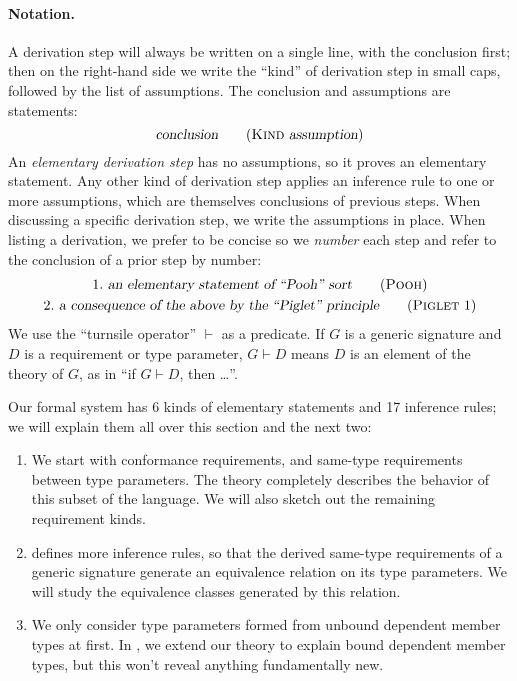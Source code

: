 \documentclass[../generics]{subfiles}
\begin{document}
\paragraph{Notation.} A derivation step will always be written on a single line, with the conclusion first; then on the right-hand side we write the ``kind'' of derivation step in small caps, followed by the list of assumptions. The conclusion and assumptions are statements:
\[\textsl{conclusion}\tag{\textsc{Kind} \textsl{assumption}}\]
An \emph{elementary derivation step} has no assumptions, so it proves an elementary statement. Any other kind of derivation step applies an inference rule to one or more assumptions, which are themselves conclusions of previous steps. When discussing a specific derivation step, we write the assumptions in place. When listing a derivation, we prefer to be concise so we \emph{number} each step and refer to the conclusion of a prior step by number:
\begin{gather*}
1.\ \textsl{an elementary statement of ``Pooh'' sort}\tag{\textsc{Pooh}}\\
2.\ \textsl{a consequence of the above by the ``Piglet'' principle}\tag{\textsc{Piglet} 1}
\end{gather*}
We use the ``turnsile operator'' $\vdash$ as a predicate. If $G$ is a generic signature and $D$ is a requirement or type parameter, \index{$\vdash$}$G\vdash D$ means $D$ is an element of the theory of $G$, as in ``if $G\vdash D$, then \ldots''.

Our formal system has 6 kinds of elementary statements and 17 inference rules; we will explain them all over this section and the next two:
\begin{enumerate}
\item We start with conformance requirements, and same-type requirements between type parameters. The theory completely describes the behavior of this subset of the language. We will also sketch out the remaining requirement kinds.
\item {} defines more inference rules, so that the derived same-type requirements of a generic signature generate an equivalence relation on its type parameters. We will study the equivalence classes generated by this relation.
\item We only consider type parameters formed from unbound dependent member types at first. In , we extend our theory to explain bound dependent member types, but this won't reveal anything fundamentally new.
\end{enumerate}
\end{document}
